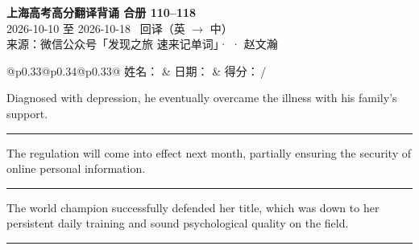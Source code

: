 \documentclass[11pt,a4paper]{article}
\newcommand{\num}[1]{\makebox[1.9em][r]{#1.}\hspace{0.3em}}
\newcommand{\wline}{\noindent\rule{\linewidth}{0.4pt}}
\begin{document}
\pagestyle{plain}
\begin{center}
{\LARGE\bfseries 上海高考高分翻译背诵 \quad 合册 110–118}\\[0.25em]
{\large 2026-10-10 至 2026-10-18 \quad\ 回译（英 $\to$ 中）}\\[0.35em]
{\footnotesize 来源：微信公众号「发现之旅 速来记单词」·  · 赵文瀚}
\end{center}

\vspace{0.4em}
\noindent\begin{tabular}{@{}p{0.33\textwidth}@{}p{0.34\textwidth}@{}p{0.33\textwidth}@{}}
姓名：\underline{\hspace{2.0cm}} & 日期：\underline{\hspace{2.0cm}} & 得分：\underline{\hspace{1.4cm}}\,/ \\
\end{tabular}

\vspace{0.5em}

\vspace{0.8em}
\vspace{0.35em}\vspace{0.15em}

\begin{minipage}{\linewidth}

\num{1}Diagnosed with depression, he eventually overcame the illness with his family’s support.

\vspace{0.25em}

\wline

\end{minipage}

\begin{minipage}{\linewidth}

\num{2}The regulation will come into effect next month, partially ensuring the security of online personal information.

\vspace{0.25em}

\wline

\end{minipage}

\begin{minipage}{\linewidth}

\num{3}The world champion successfully defended her title, which was down to her persistent daily training and sound psychological quality on the field.

\vspace{0.25em}

\wline

\end{minipage}
\end{document}
